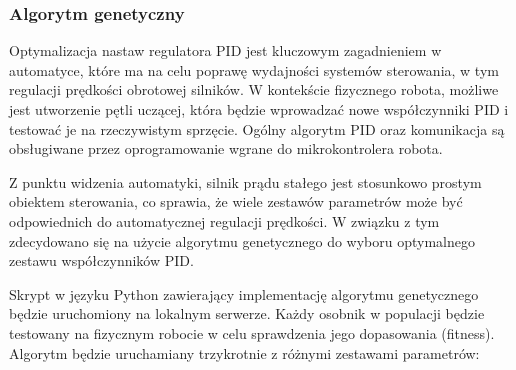 \documentclass[12pt,twoside]{article}
\begin{document}
\subsubsection{Algorytm genetyczny}

Optymalizacja nastaw regulatora PID jest kluczowym zagadnieniem w automatyce, które ma na celu poprawę wydajności systemów sterowania, w tym regulacji prędkości obrotowej silników. W kontekście fizycznego robota, możliwe jest utworzenie pętli uczącej, która będzie wprowadzać nowe współczynniki PID i testować je na rzeczywistym sprzęcie. Ogólny algorytm PID oraz komunikacja są obsługiwane przez oprogramowanie wgrane do mikrokontrolera robota. 

Z punktu widzenia automatyki, silnik prądu stałego jest stosunkowo prostym obiektem sterowania, co sprawia, że wiele zestawów parametrów może być odpowiednich do automatycznej regulacji prędkości. W związku z tym zdecydowano się na użycie algorytmu genetycznego do wyboru optymalnego zestawu współczynników PID.

Skrypt w języku Python zawierający implementację algorytmu genetycznego będzie uruchomiony na lokalnym serwerze. Każdy osobnik w populacji będzie testowany na fizycznym robocie w celu sprawdzenia jego dopasowania (fitness). Algorytm będzie uruchamiany trzykrotnie z różnymi zestawami parametrów:
\end{document}
